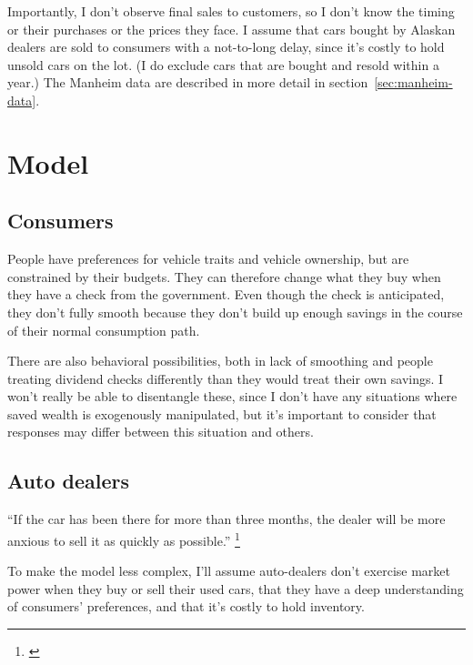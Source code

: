 \documentclass[11pt,letterpaper,oneside]{article}
\begin{document}
Importantly, I don't observe final sales to customers, so I don't know the timing or their purchases or the prices they face.
I assume that cars bought by Alaskan dealers are sold to consumers with a not-to-long delay, since it's costly to hold unsold cars on the lot.
(I do exclude cars that are bought and resold within a year.)
The Manheim data are described in more detail in section~\ref{sec:manheim-data}.



\section{Model}




\subsection{Consumers}


People have preferences for vehicle traits and vehicle ownership, but are constrained by their budgets.
They can therefore change what they buy when they have a check from the government.
Even though the check is anticipated, they don't fully smooth because they don't build up enough savings in the course of their normal consumption path.

There are also behavioral possibilities, both in lack of smoothing and people treating dividend checks differently than they would treat their own savings.
I won't really be able to disentangle these, since I don't have any situations where saved wealth is exogenously manipulated, but it's important to consider that responses may differ between this situation and others.

\subsection{Auto dealers}

``If the car has been there for more than three months, the dealer will be more anxious to sell it as quickly as possible.''%
\footnote{\textcite{usnews_car_deals}} %

To make the model less complex, I'll assume auto-dealers don't exercise market power when they buy or sell their used cars, that they have a deep understanding of consumers' preferences, and that it's costly to hold inventory.
\end{document}
